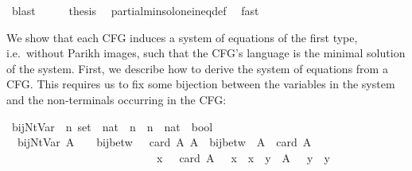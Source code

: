 \begin{isabellebody}
\ blast\isanewline
\ \ \isamarkupfalse%
\ \isamarkupfalse%
\ {\isacharquery}{\kern0pt}thesis\ \isamarkupfalse%
\ partial{\isacharunderscore}{\kern0pt}min{\isacharunderscore}{\kern0pt}sol{\isacharunderscore}{\kern0pt}one{\isacharunderscore}{\kern0pt}ineq{\isacharunderscore}{\kern0pt}def\ \isamarkupfalse%
\ fast\isanewline
{}\isamarkupfalse%
%
\endisatagproof
{\isafoldproof}%
%
\isadelimproof
%
\endisadelimproof
%
\isadelimdocument
%
\endisadelimdocument
%
\isatagdocument
%
\isamarkuptrue%
%
\endisatagdocument
{\isafolddocument}%
%
\isadelimdocument
%
\endisadelimdocument
%
\begin{isamarkuptext}%
We show that each CFG induces a system of equations of the first type, i.e.\ without Parikh images,
such that the CFG's language is the minimal solution of the system. First, we describe how to derive
the system of equations from a CFG. This requires us to fix some bijection between the variables in
the system and the non-terminals occurring in the CFG:%
\end{isamarkuptext}\isamarkuptrue%
\isamarkupfalse%
\ bij{\isacharunderscore}{\kern0pt}Nt{\isacharunderscore}{\kern0pt}Var\ {\isacharcolon}{\kern0pt}{\isacharcolon}{\kern0pt}\ {\isachardoublequoteopen}{\isacharprime}{\kern0pt}n\ set\ {\isasymRightarrow}\ {\isacharparenleft}{\kern0pt}nat\ {\isasymRightarrow}\ {\isacharprime}{\kern0pt}n{\isacharparenright}{\kern0pt}\ {\isasymRightarrow}\ {\isacharparenleft}{\kern0pt}{\isacharprime}{\kern0pt}n\ {\isasymRightarrow}\ nat{\isacharparenright}{\kern0pt}\ {\isasymRightarrow}\ bool{\isachardoublequoteclose}\ \isanewline
\ \ {\isachardoublequoteopen}bij{\isacharunderscore}{\kern0pt}Nt{\isacharunderscore}{\kern0pt}Var\ A\ {\isasymgamma}\ {\isasymgamma}{\isacharprime}{\kern0pt}\ {\isasymequiv}\ bij{\isacharunderscore}{\kern0pt}betw\ {\isasymgamma}\ {\isacharbraceleft}{\kern0pt}{\isachardot}{\kern0pt}{\isachardot}{\kern0pt}{\isacharless}{\kern0pt}\ card\ A{\isacharbraceright}{\kern0pt}\ A\ {\isasymand}\ bij{\isacharunderscore}{\kern0pt}betw\ {\isasymgamma}{\isacharprime}{\kern0pt}\ A\ {\isacharbraceleft}{\kern0pt}{\isachardot}{\kern0pt}{\isachardot}{\kern0pt}{\isacharless}{\kern0pt}\ card\ A{\isacharbraceright}{\kern0pt}\isanewline
\ \ \ \ \ \ \ \ \ \ \ \ \ \ \ \ \ \ \ \ \ \ \ \ \ \ {\isasymand}\ {\isacharparenleft}{\kern0pt}{\isasymforall}x\ {\isasymin}\ {\isacharbraceleft}{\kern0pt}{\isachardot}{\kern0pt}{\isachardot}{\kern0pt}{\isacharless}{\kern0pt}\ card\ A{\isacharbraceright}{\kern0pt}{\isachardot}{\kern0pt}\ {\isasymgamma}{\isacharprime}{\kern0pt}\ {\isacharparenleft}{\kern0pt}{\isasymgamma}\ x{\isacharparenright}{\kern0pt}\ {\isacharequal}{\kern0pt}\ x{\isacharparenright}{\kern0pt}\ {\isasymand}\ {\isacharparenleft}{\kern0pt}{\isasymforall}y\ {\isasymin}\ A{\isachardot}{\kern0pt}\ {\isasymgamma}\ {\isacharparenleft}{\kern0pt}{\isasymgamma}{\isacharprime}{\kern0pt}\ y{\isacharparenright}{\kern0pt}\ {\isacharequal}{\kern0pt}\ y{\isacharparenright}{\kern0pt}{\isachardoublequoteclose}\isanewline

\end{isabellebody}
